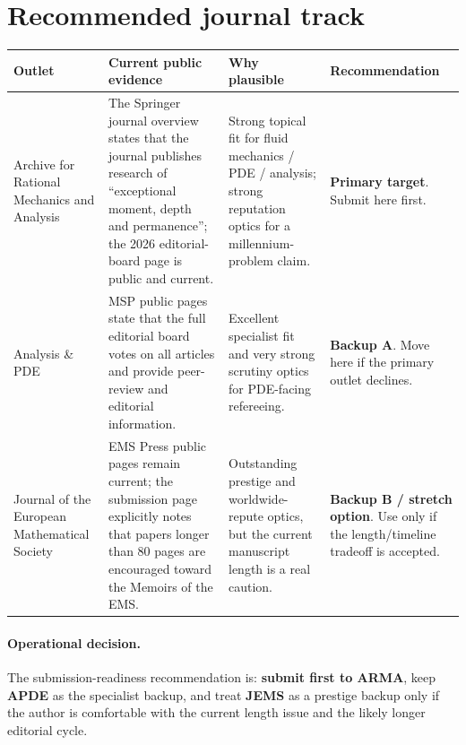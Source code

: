 \documentclass[11pt]{article}
\begin{document}
\section{Recommended journal track}
\begin{tabularx}{\textwidth}{@{}L{0.19\textwidth}L{0.28\textwidth}L{0.21\textwidth}Y@{}}
\toprule
\textbf{Outlet} & \textbf{Current public evidence} & \textbf{Why plausible} & \textbf{Recommendation}\\
\midrule
Archive for Rational Mechanics and Analysis & The Springer journal overview states that the journal publishes research of ``exceptional moment, depth and permanence''; the 2026 editorial-board page is public and current. & Strong topical fit for fluid mechanics / PDE / analysis; strong reputation optics for a millennium-problem claim. & \textbf{Primary target}. Submit here first.\\[0.4em]
Analysis \& PDE & MSP public pages state that the full editorial board votes on all articles and provide peer-review and editorial information. & Excellent specialist fit and very strong scrutiny optics for PDE-facing refereeing. & \textbf{Backup A}. Move here if the primary outlet declines.\\[0.4em]
Journal of the European Mathematical Society & EMS Press public pages remain current; the submission page explicitly notes that papers longer than 80 pages are encouraged toward the Memoirs of the EMS. & Outstanding prestige and worldwide-repute optics, but the current manuscript length is a real caution. & \textbf{Backup B / stretch option}. Use only if the length/timeline tradeoff is accepted.\\
\bottomrule
\end{tabularx}

\paragraph{Operational decision.}
The submission-readiness recommendation is: \textbf{submit first to ARMA}, keep \textbf{APDE} as the specialist backup, and treat \textbf{JEMS} as a prestige backup only if the author is comfortable with the current length issue and the likely longer editorial cycle.
\end{document}
